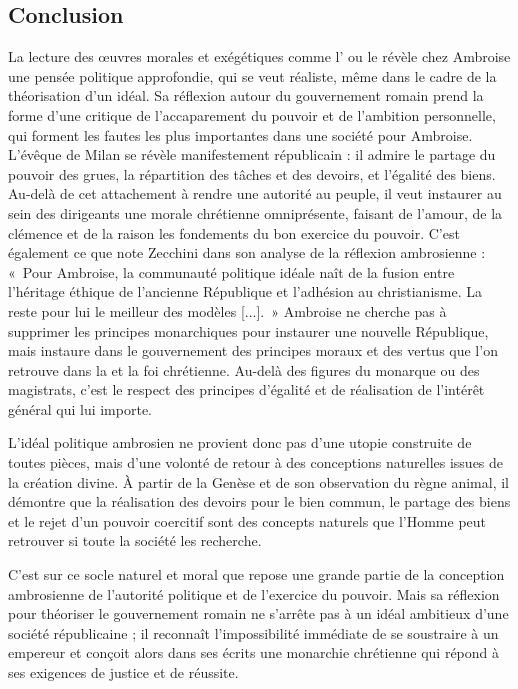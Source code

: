 \bigskip

\subsection*{Conclusion}

La lecture des œuvres morales et exégétiques comme l' ou le  révèle chez Ambroise une pensée politique approfondie, qui se veut réaliste, même dans le cadre de la théorisation d'un idéal. Sa réflexion autour du gouvernement romain prend la forme d'une critique de l'accaparement du pouvoir et de l'ambition personnelle, qui forment les fautes les plus importantes dans une société pour Ambroise. L'évêque de Milan se révèle manifestement républicain : il admire le partage du pouvoir des grues, la répartition des tâches et des devoirs, et l'égalité des biens. Au-delà de cet attachement à rendre une autorité au peuple, il veut instaurer au sein des dirigeants une morale chrétienne omniprésente, faisant de l'amour, de la clémence et de la raison les fondements du bon exercice du pouvoir. C'est également ce que note Zecchini dans son analyse de la réflexion ambrosienne : «~Pour Ambroise, la communauté politique idéale naît de la fusion entre l'héritage éthique de l'ancienne République et l'adhésion au christianisme. La  reste pour lui le meilleur des modèles [...].\autocite[163]{zecchini_pensiero_politico}~» Ambroise ne cherche pas à supprimer les principes monarchiques pour instaurer une nouvelle République, mais instaure dans le gouvernement des principes moraux et des vertus que l'on retrouve dans la  et la foi chrétienne. Au-delà des figures du monarque ou des magistrats, c'est le respect des principes d'égalité et de réalisation de l'intérêt général qui lui importe.

\bigskip

L'idéal politique ambrosien ne provient donc pas d'une utopie construite de toutes pièces, mais d'une volonté de retour à des conceptions naturelles issues de la création divine. À partir de la Genèse et de son observation du règne animal, il démontre que la réalisation des devoirs pour le bien commun, le partage des biens et le rejet d'un pouvoir coercitif sont des concepts naturels que l'Homme peut retrouver si toute la société les recherche.

\bigskip

C'est sur ce socle naturel et moral que repose une grande partie de la conception ambrosienne de l'autorité politique et de l'exercice du pouvoir. Mais sa réflexion pour théoriser le gouvernement romain ne s'arrête pas à un idéal ambitieux d'une société républicaine ; il reconnaît l'impossibilité immédiate de se soustraire à un empereur et conçoit alors dans ses écrits une monarchie chrétienne qui répond à ses exigences de justice et de réussite.
